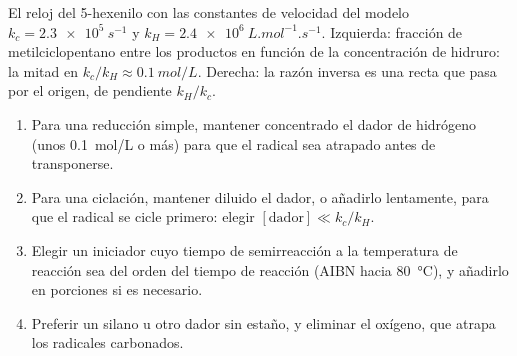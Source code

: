 \begin{omfigure}

{\small El reloj del 5-hexenilo con las constantes de velocidad del modelo $k_c = \qty{2.3e5}{s^{-1}}$ y
$k_H = \qty{2.4e6}{L.mol^{-1}.s^{-1}}$. Izquierda: fracción de metilciclopentano entre los productos en función de la
concentración de hidruro: la mitad en $k_c/k_H \approx \qty{0.1}{mol/L}$. Derecha: la razón inversa es una recta
que pasa por el origen, de pendiente $k_H/k_c$.}
\end{omfigure}

\begin{method}\label{met:b3:radicals-carbenes:radical-chain}
\begin{enumerate}
  \item Para una reducción simple, mantener concentrado el dador de hidrógeno (unos
        \qty{0.1}{mol/L} o más) para que el radical sea atrapado antes de transponerse.
  \item Para una ciclación, mantener diluido el dador, o añadirlo lentamente, para que el
        radical se cicle primero: elegir $[\text{dador}] \ll k_c/k_H$.
  \item Elegir un iniciador cuyo tiempo de semirreacción a la temperatura de reacción sea del
        orden del tiempo de reacción (AIBN hacia \qty{80}{\celsius}), y añadirlo en porciones si
        es necesario.
  \item Preferir un silano u otro dador sin estaño, y eliminar el oxígeno, que atrapa
        los radicales carbonados.
\end{enumerate}
\end{method}

